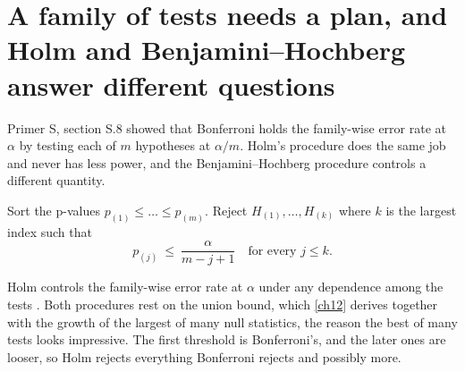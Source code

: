 

\section{A family of tests needs a plan, and Holm and Benjamini--Hochberg answer different questions}\label{sec:ch09:multiple}

Primer S, section S.8 showed that Bonferroni holds the family-wise error rate at $\alpha$ by testing each of $m$ hypotheses at $\alpha/m$. Holm's procedure does the same job and never has less power, and the Benjamini--Hochberg procedure controls a different quantity.

\begin{definition}\label{def:ch09:holm}
Sort the p-values $p_{(1)}\le\dots\le p_{(m)}$. Reject $H_{(1)},\dots,H_{(k)}$ where $k$ is the largest index such that
\begin{equation}
p_{(j)}\ \le\ \frac{\alpha}{m-j+1}\quad\text{for every } j\le k.
\label{eq:ch09:holm}
\end{equation}
\end{definition}
Holm controls the family-wise error rate at $\alpha$ under any dependence among the tests \citep{holm1979}. Both procedures rest on the union bound, which \cref{ch12} derives together with the growth of the largest of many null statistics, the reason the best of many tests looks impressive. The first threshold is Bonferroni's, and the later ones are looser, so Holm rejects everything Bonferroni rejects and possibly more.


